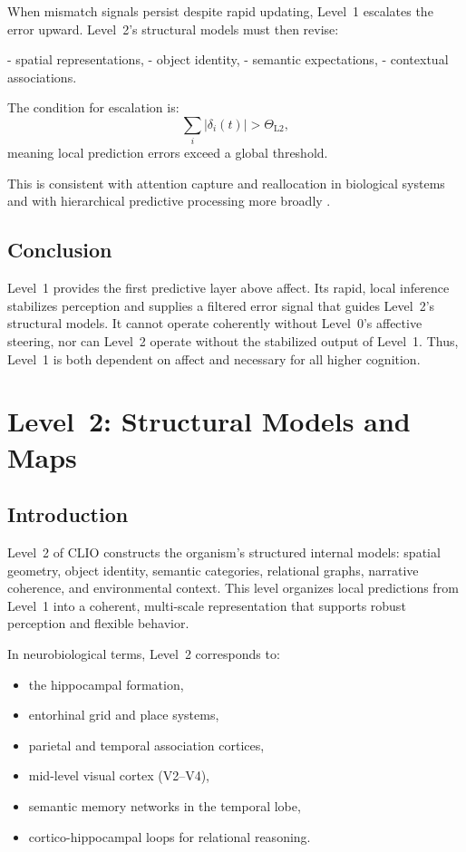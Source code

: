 \documentclass[12pt,oneside]{book}
\theoremstyle{plain}
\theoremstyle{definition}
\let\citep\parencite
\begin{document}
When mismatch signals persist despite rapid updating, Level~1 escalates
the error upward.
Level~2’s structural models must then revise:

- spatial representations,
- object identity,
- semantic expectations,
- contextual associations.

The condition for escalation is:
\[
\sum_{i} |\delta_i(t)| > \Theta_{\mathrm{L2}},
\]
meaning local prediction errors exceed a global threshold.

This is consistent with attention capture and reallocation in biological
systems \citep{posner2012attention} and with hierarchical predictive
processing more broadly \citep{huang2011predictive}.

\section{Conclusion}

Level~1 provides the first predictive layer above affect.
Its rapid, local inference stabilizes perception and supplies a filtered
error signal that guides Level~2’s structural models.
It cannot operate coherently without Level~0’s affective steering,
nor can Level~2 operate without the stabilized output of Level~1.
Thus, Level~1 is both dependent on affect and necessary for all
higher cognition.

\chapter{Level~2: Structural Models and Maps}

\section{Introduction}

Level~2 of CLIO constructs the organism’s structured internal models:
spatial geometry, object identity, semantic categories, relational graphs,
narrative coherence, and environmental context.
This level organizes local predictions from Level~1 into a coherent,
multi-scale representation that supports robust perception and flexible
behavior.

In neurobiological terms, Level~2 corresponds to:

\begin{itemize}
  \item the hippocampal formation,
  \item entorhinal grid and place systems,
  \item parietal and temporal association cortices,
  \item mid-level visual cortex (V2–V4),
  \item semantic memory networks in the temporal lobe,
  \item cortico-hippocampal loops for relational reasoning.
\end{itemize}
\end{document}
